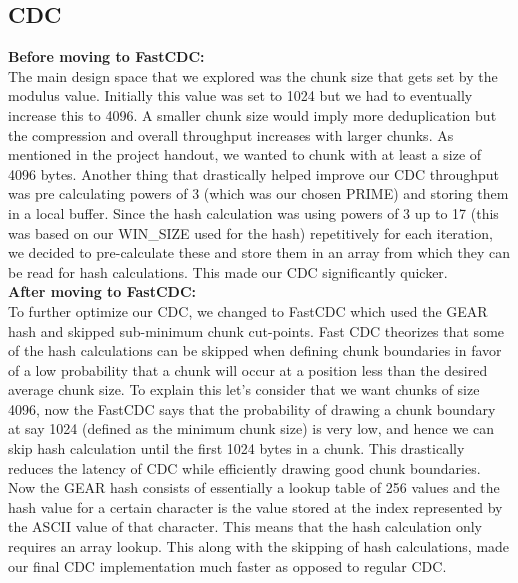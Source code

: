 \documentclass[../main.tex]{subfiles}
\begin{document}
\subsection{\textbf{CDC}}

\noindent \textbf{Before moving to FastCDC:}  \\
The main design space that we explored was the chunk size that gets set by the modulus value. Initially this value was set to 1024 but we had to eventually increase this to 4096. A smaller chunk size would imply more deduplication but the compression and overall throughput increases with larger chunks. As mentioned in the project handout, we wanted to chunk with at least a size of 4096 bytes. Another thing that drastically helped improve our CDC throughput was pre calculating powers of 3 (which was our chosen PRIME) and storing them in a local buffer. Since the hash calculation was using powers of 3 up to 17 (this was based on our WIN\_SIZE used for the hash) repetitively for each iteration, we decided to pre-calculate these and store them in an array from which they can be read for hash calculations. This made our CDC significantly quicker. \\
\newline
\textbf{After moving to FastCDC:}  \\
To further optimize our CDC, we changed to FastCDC which used the GEAR hash and skipped sub-minimum chunk cut-points. Fast CDC theorizes that some of the hash calculations can be skipped when defining chunk boundaries in favor of a low probability that a chunk will occur at a position less than the desired average chunk size. To explain this let’s consider that we want chunks of size 4096, now the FastCDC says that the probability of drawing a chunk boundary at say 1024 (defined as the minimum chunk size) is very low, and hence we can skip hash calculation until the first 1024 bytes in a chunk. This drastically reduces the latency of CDC while efficiently drawing good chunk boundaries. \\
\newline
Now the GEAR hash consists of essentially a lookup table of 256 values and the hash value for a certain character is the value stored at the index represented by the ASCII value of that character. This means that the hash calculation only requires an array lookup. This along with the skipping of hash calculations, made our final CDC implementation much faster as opposed to regular CDC.\\

\vspace{1cm}
\end{document}
